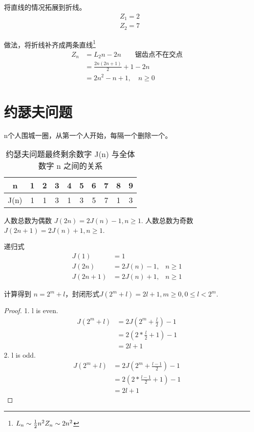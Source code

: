 \documentclass[mode=geye]{elegantnote}
\begin{document}
\begin{remark}
	将直线的情况拓展到折线。
	\begin{align*}
		&Z_1 = 2\\
		&Z_2 = 7
	\end{align*}
\end{remark}
做法，将折线补齐成两条直线\footnote{$ L_n \sim \frac{1}{2}n^2\\ Z_n \sim 2n^2 $}
\begin{align*}
	Z_n& = L_2n-2n \qquad\text{锯齿点不在交点}\\
	&=\frac{2n(2n+1)}{2}+1 - 2n\\
	&=2n^2-n+1, \quad n\geqslant 0
\end{align*}

\section{约瑟夫问题}
n个人围城一圈，从第一个人开始，每隔一个删除一个。

\begin{table}[htbp]
	\centering
	\small
	\caption{约瑟夫问题最终剩余数字 J(n) 与全体数字 n 之间的关系}
	\begin{tabular}{c|ccccccccc}
		\toprule
		n & 1 & 2 & 3 & 4 & 5 & 6 & 7 & 8 & 9 \\  
		\midrule
		J(n) & 1 & 1 & 3 & 1 & 3 & 5 & 7 & 1 & 3\\
		\bottomrule
	\end{tabular}%
	\label{tab:reg}%
\end{table}%

人数总数为偶数 $ J(2n)   = 2J(n)-1, n\geqslant 1 $.
人数总数为奇数 $ J(2n+1) = 2J(n)+1, n\geqslant 1 $.

递归式
\begin{align*}
	J(1)  &= 1&\\
	J(2n) &= 2J(n)-1,&  n\geqslant 1 \\
	J(2n+1) &= 2J(n)+1,&  n\geqslant 1 
\end{align*}

计算得到 $ n = 2^m+l $，封闭形式$ J(2^m+l) = 2l+1, m\geqslant 0, 0\leqslant l <2^m  $.
\begin{proof}
	1. l is even.
	\begin{align*}
		J(2^m+l) &= 2J(2^m+\frac{l}{2})-1\\
		&=2(2*\frac{l}{2}+1)-1\\
		&=2l+1
	\end{align*}
	2. l is odd.
	\begin{align*}
		J(2^m+l) &= 2J(2^m+\frac{l-1}{2})-1\\
		&=2(2*\frac{l-1}{2}+1)-1\\
		&=2l+1
	\end{align*}
\end{proof}
\end{document}

